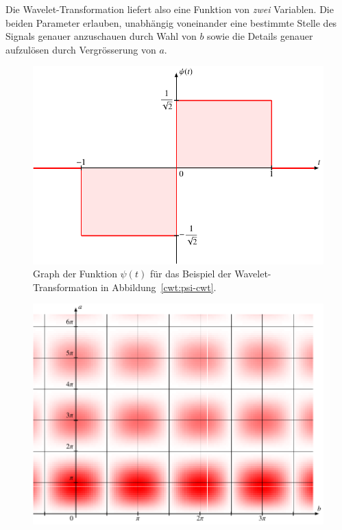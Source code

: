 Die Wavelet-Transformation liefert also eine Funktion von {\em zwei}
Variablen.
Die beiden Parameter erlauben, unabhängig voneinander eine bestimmte
Stelle des Signals genauer anzuschauen durch Wahl von $b$ sowie die
Details genauer aufzulösen durch Vergrösserung von $a$.

\begin{beispiel}
\begin{figure}
\centering
\includegraphics{chapters/4-cwt/images/psigraph.pdf}
\caption{Graph der Funktion $\psi(t)$ für das Beispiel der
Wavelet-Transformation in Abbildung~\ref{cwt:psi-cwt}.
\label{cwt:psi-graph}}
\end{figure}
\begin{figure}
\centering
\includegraphics[width=\hsize]{chapters/4-cwt/images/psisin.pdf}

\end{figure}
\end{beispiel}
